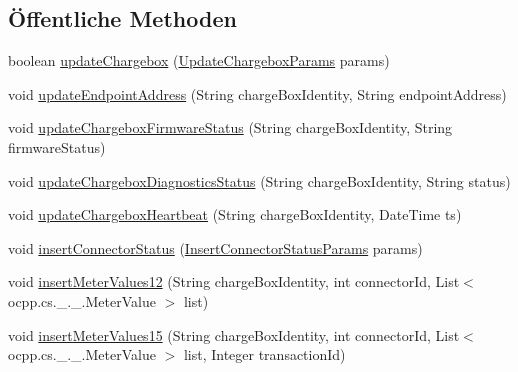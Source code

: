 \subsection*{Öffentliche Methoden}
\begin{DoxyCompactItemize}
\item 
boolean \hyperlink{interfacede_1_1rwth_1_1idsg_1_1steve_1_1repository_1_1_ocpp_server_repository_a48075ea356efeaab5fd480088a32e688}{update\-Chargebox} (\hyperlink{classde_1_1rwth_1_1idsg_1_1steve_1_1repository_1_1dto_1_1_update_chargebox_params}{Update\-Chargebox\-Params} params)
\item 
void \hyperlink{interfacede_1_1rwth_1_1idsg_1_1steve_1_1repository_1_1_ocpp_server_repository_abf41cab95009f461986a611f43e3f226}{update\-Endpoint\-Address} (String charge\-Box\-Identity, String endpoint\-Address)
\item 
void \hyperlink{interfacede_1_1rwth_1_1idsg_1_1steve_1_1repository_1_1_ocpp_server_repository_afbd7ab89a03cb005ab824b3ce84fbc30}{update\-Chargebox\-Firmware\-Status} (String charge\-Box\-Identity, String firmware\-Status)
\item 
void \hyperlink{interfacede_1_1rwth_1_1idsg_1_1steve_1_1repository_1_1_ocpp_server_repository_ade86b237d803f260a241497a561a96c0}{update\-Chargebox\-Diagnostics\-Status} (String charge\-Box\-Identity, String status)
\item 
void \hyperlink{interfacede_1_1rwth_1_1idsg_1_1steve_1_1repository_1_1_ocpp_server_repository_a8454728b389fe9bd86522d8d5c6199e2}{update\-Chargebox\-Heartbeat} (String charge\-Box\-Identity, Date\-Time ts)
\item 
void \hyperlink{interfacede_1_1rwth_1_1idsg_1_1steve_1_1repository_1_1_ocpp_server_repository_a169110fec80f4bca57c1c9ec39a8d104}{insert\-Connector\-Status} (\hyperlink{classde_1_1rwth_1_1idsg_1_1steve_1_1repository_1_1dto_1_1_insert_connector_status_params}{Insert\-Connector\-Status\-Params} params)
\item 
void \hyperlink{interfacede_1_1rwth_1_1idsg_1_1steve_1_1repository_1_1_ocpp_server_repository_afb15fceb9f5da8204816ad7cbc53bedc}{insert\-Meter\-Values12} (String charge\-Box\-Identity, int connector\-Id, List$<$ ocpp.\-cs.\-\_.\-\_.\-Meter\-Value $>$ list)
\item 
void \hyperlink{interfacede_1_1rwth_1_1idsg_1_1steve_1_1repository_1_1_ocpp_server_repository_abe132ff15dbaaa31a5838eeb110c6520}{insert\-Meter\-Values15} (String charge\-Box\-Identity, int connector\-Id, List$<$ ocpp.\-cs.\-\_.\-\_.\-Meter\-Value $>$ list, Integer transaction\-Id)

\end{DoxyCompactItemize}
